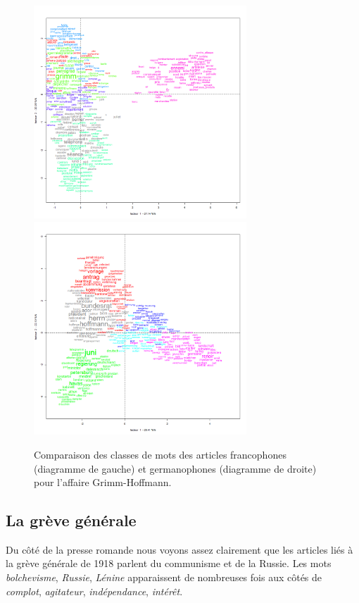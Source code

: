 \documentclass[french,a4paper]{article}
\begin{document}
\begin{figure}[h!]
    \includegraphics[width=8cm]{imgs/FR/Hoffmann_15classes.png}
    \includegraphics[width=8cm]{imgs/DE/Hoffmann_15classes.png}
    \caption{Comparaison des classes de mots des articles francophones (diagramme de gauche) et germanophones (diagramme de droite) pour l'affaire Grimm-Hoffmann.}
    \centering
    \label{fig:hoffmann}
\end{figure}

\subsection*{La grève générale}

Du côté de la presse romande nous voyons assez clairement que les articles liés à la grève générale de 1918 parlent du communisme et de la Russie.
Les mots \textit{bolchevisme}, \textit{Russie}, \textit{Lénine} apparaissent de nombreuses fois aux côtés de \textit{complot}, \textit{agitateur}, \textit{indépendance}, \textit{intérêt}.
\end{document}
